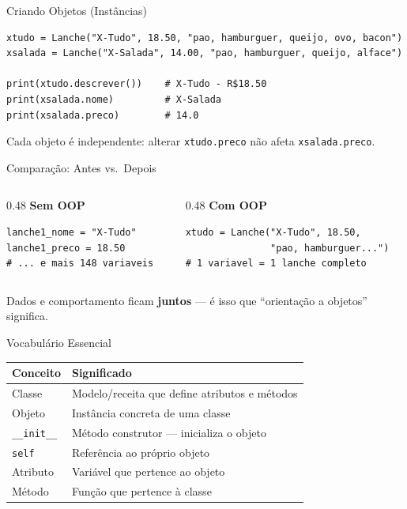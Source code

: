 \documentclass[aspectratio=169]{beamer}
\begin{document}
\begin{frame}[fragile]{Criando Objetos (Instâncias)}
  \begin{lstlisting}
xtudo = Lanche("X-Tudo", 18.50, "pao, hamburguer, queijo, ovo, bacon")
xsalada = Lanche("X-Salada", 14.00, "pao, hamburguer, queijo, alface")

print(xtudo.descrever())    # X-Tudo - R$18.50
print(xsalada.nome)         # X-Salada
print(xsalada.preco)        # 14.0
  \end{lstlisting}

  \vspace{0.3cm}
  Cada objeto é independente: alterar \texttt{xtudo.preco} não afeta
  \texttt{xsalada.preco}.
\end{frame}

\begin{frame}[fragile]{Comparação: Antes vs.\ Depois}
  \begin{columns}[T]
    \begin{column}{0.48\textwidth}
      \textbf{Sem OOP}
      \begin{lstlisting}[basicstyle=\ttfamily\scriptsize]
lanche1_nome = "X-Tudo"
lanche1_preco = 18.50
# ... e mais 148 variaveis
      \end{lstlisting}
    \end{column}
    \begin{column}{0.48\textwidth}
      \textbf{Com OOP}
      \begin{lstlisting}[basicstyle=\ttfamily\scriptsize]
xtudo = Lanche("X-Tudo", 18.50,
               "pao, hamburguer...")
# 1 variavel = 1 lanche completo
      \end{lstlisting}
    \end{column}
  \end{columns}

  \vspace{0.5cm}
  Dados e comportamento ficam \textbf{juntos} --- é isso que
  ``orientação a objetos'' significa.
\end{frame}

\begin{frame}{Vocabulário Essencial}
  \begin{table}
    \centering
    \begin{tabular}{ll}
      \toprule
      \textbf{Conceito} & \textbf{Significado} \\
      \midrule
      Classe         & Modelo/receita que define atributos e métodos \\
      Objeto         & Instância concreta de uma classe \\
      \texttt{\_\_init\_\_}  & Método construtor --- inicializa o objeto \\
      \texttt{self}  & Referência ao próprio objeto \\
      Atributo       & Variável que pertence ao objeto \\
      Método         & Função que pertence à classe \\
      \bottomrule
    \end{tabular}
  \end{table}
\end{frame}
\end{document}
